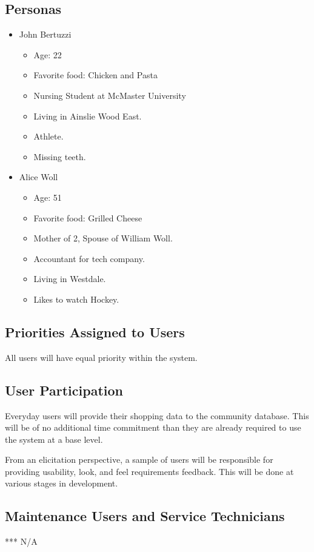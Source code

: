 \documentclass[12pt]{article}
\begin{document}
\subsection{Personas}
\begin{itemize}
  \item John Bertuzzi
  \begin{itemize}
    \item Age: 22
    \item Favorite food: Chicken and Pasta
    \item Nursing Student at McMaster University
    \item Living in Ainslie Wood East.
    \item Athlete.
    \item Missing teeth.
  \end{itemize}
  \item Alice Woll
  \begin{itemize}
    \item Age: 51
    \item Favorite food: Grilled Cheese
    \item Mother of 2, Spouse of William Woll.
    \item Accountant for tech company.
    \item Living in Westdale.
    \item Likes to watch Hockey.
  \end{itemize}
\end{itemize}

\subsection{Priorities Assigned to Users}
All users will have equal priority within the system.

\subsection{User Participation}
Everyday users will provide their shopping data to the community database. This will be of no additional time commitment than they are already required to use the system at a base level.

From an elicitation perspective, a sample of users will be responsible for providing usability, look, and feel requirements feedback. This will be done at various stages in development.
\subsection{Maintenance Users and Service Technicians}
*** N/A
\end{document}
